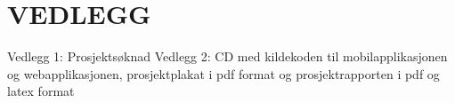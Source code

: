 \documentclass[../main.tex]{subfiles}
\begin{document}
\appendix

\section{VEDLEGG}

Vedlegg 1: Prosjektsøknad\newline
\newline
Vedlegg 2: CD med kildekoden til mobilapplikasjonen og webapplikasjonen, prosjektplakat i pdf format og prosjektrapporten i pdf og latex format
\end{document}
